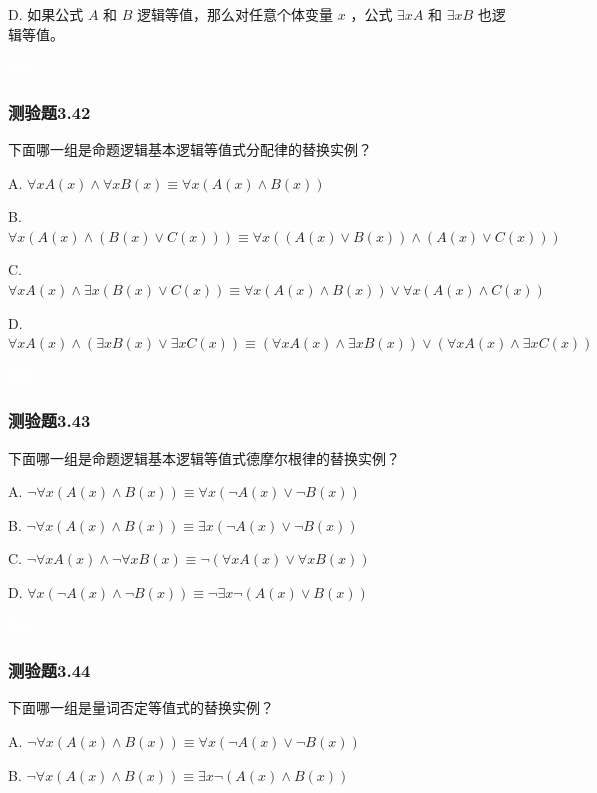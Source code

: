 \documentclass[UTF8, heading=true]{ctexart}
\begin{document}
D.
如果公式 $A$ 和 $B$ 逻辑等值，那么对任意个体变量 $x$ ，公式 $\exists x A$ 和 $\exists x B$ 也逻辑等值。


\textcolor{white}{答案：CD}

\subsubsection{测验题3.42}

下面哪一组是命题逻辑基本逻辑等值式分配律的替换实例？

A. $\forall x A(x) \wedge \forall x B(x) \equiv \forall x(A(x) \wedge B(x))$

B. $\forall x(A(x) \wedge(B(x) \vee C(x))) \equiv \forall x((A(x) \vee B(x)) \wedge(A(x) \vee C(x)))$

C. $\forall x A(x) \wedge \exists x(B(x) \vee C(x)) \equiv \forall x(A(x) \wedge B(x)) \vee \forall x(A(x) \wedge C(x))$

D. $\forall x A(x) \wedge(\exists x B(x) \vee \exists x C(x)) \equiv(\forall x A(x) \wedge \exists x B(x)) \vee(\forall x A(x) \wedge \exists x C(x))$

\textcolor{white}{答案：D}

\subsubsection{测验题3.43}

下面哪一组是命题逻辑基本逻辑等值式德摩尔根律的替换实例？

A. $ \neg \forall x(A(x) \wedge B(x)) \equiv \forall x(\neg A(x) \vee \neg B(x))$

B. $\neg \forall x(A(x) \wedge B(x)) \equiv \exists x(\neg A(x) \vee \neg B(x))$

C. $\neg \forall x A(x) \wedge \neg \forall x B(x) \equiv \neg(\forall x A(x) \vee \forall x B(x))$

D. $\forall x(\neg A(x) \wedge \neg B(x)) \equiv \neg \exists x \neg(A(x) \vee B(x))$

\textcolor{white}{答案：C}

\subsubsection{测验题3.44}

下面哪一组是量词否定等值式的替换实例？

A. $\neg \forall x(A(x) \wedge B(x)) \equiv \forall x(\neg A(x) \vee \neg B(x))$

B. $\neg \forall x(A(x) \wedge B(x)) \equiv \exists x \neg(A(x) \wedge B(x))$
\end{document}
